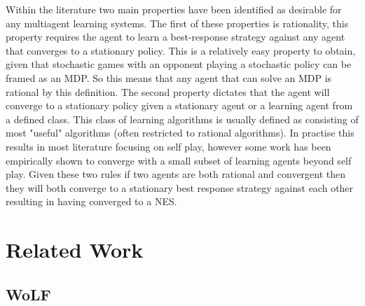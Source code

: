 \documentclass[conference]{IEEEtran}
\begin{document}
Within the literature two main properties have been identified as desirable for any multiagent learning systems. The first of these properties is rationality, this property requires the agent to learn a best-response strategy against any agent that converges to a stationary policy. This is a relatively easy property to obtain, given that stochastic games with an opponent playing a stochastic policy can be framed as an MDP. So this means that any agent that can solve an MDP is rational by this definition\cite{bowling2002multiagent}. The second property dictates that the agent will converge to a stationary policy given a stationary agent or a learning agent from a defined class. This class of learning algorithms is usually defined as consisting of most "useful" algorithms (often restricted to rational algorithms). In practise this results in most literature focusing on self play, however some work has been empirically shown to converge with a small subset of learning agents beyond self play\cite{bowling2002multiagent}. Given these two rules if two agents are both rational and convergent then they will both converge to a stationary best response strategy against each other resulting in having converged to a NES.


\section{Related Work}

\subsection{WoLF}
\end{document}
